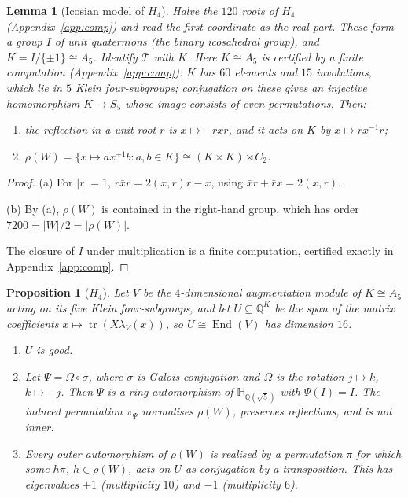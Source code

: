 \documentclass[11pt]{amsart}
\newtheorem{lemma}[theorem]{Lemma}
\newtheorem{proposition}[theorem]{Proposition}
\theoremstyle{definition}
\newcommand{\Q}{\mathbb{Q}}
\newcommand{\HH}{\mathbb{H}}
\newcommand{\T}{\mathcal{T}}
\newcommand{\End}{\operatorname{End}}
\begin{document}
\begin{lemma}[Icosian model of $H_4$]\label{lem:icosian}
Halve the $120$ roots of $H_4$ (Appendix~\ref{app:comp}) and read the first coordinate as the real part. These
form a group $I$ of unit quaternions (the binary icosahedral group), and $K=I/\{\pm1\}\cong A_5$. Identify $\T$ with
$K$. Here $K\cong A_5$ is certified by a finite computation (Appendix~\ref{app:comp}): $K$ has $60$ elements and $15$
involutions, which lie in $5$ Klein four-subgroups; conjugation on these gives an injective homomorphism
$K\to S_5$ whose image consists of even permutations. Then:
\begin{enumerate}[label=(\alph*)]
\item the reflection in a unit root $r$ is $x\mapsto-r\bar xr$, and it acts on $K$ by $x\mapsto rx^{-1}r$;
\item $\rho(W)=\{x\mapsto ax^{\pm1}b:a,b\in K\}\cong(K\times K)\rtimes C_2$.
\end{enumerate}
\end{lemma}

\begin{proof}
(a) For $|r|=1$, $r\bar xr=2(x,r)r-x$, using $\bar xr+\bar rx=2(x,r)$.

(b) By (a), $\rho(W)$ is contained in the right-hand group, which has order $7200=|W|/2=|\rho(W)|$.

The closure of $I$ under multiplication is a finite computation, certified exactly in Appendix~\ref{app:comp}.
\end{proof}

\begin{proposition}[$H_4$]\label{prop:H4}
Let $V$ be the $4$-dimensional augmentation module of $K\cong A_5$ acting on its five Klein four-subgroups, and
let $U\subseteq\Q^K$ be the span of the matrix coefficients $x\mapsto\operatorname{tr}(X\lambda_V(x))$, so
$U\cong\End(V)$ has dimension $16$.
\begin{enumerate}[label=(\alph*)]
\item $U$ is good.
\item Let $\Psi=\Omega\circ\sigma$, where $\sigma$ is Galois conjugation and $\Omega$ is the rotation $j\mapsto k$,
$k\mapsto-j$. Then $\Psi$ is a ring automorphism of $\HH_{\Q(\sqrt5)}$ with $\Psi(I)=I$. The induced permutation
$\pi_\Psi$ normalises $\rho(W)$, preserves reflections, and is not inner.
\item Every outer automorphism of $\rho(W)$ is realised by a permutation $\pi$ for which some
$h\pi$, $h\in\rho(W)$, acts on $U$ as conjugation by a transposition. This has
eigenvalues $+1$ (multiplicity $10$) and $-1$ (multiplicity $6$).
\end{enumerate}
\end{proposition}
\end{document}
